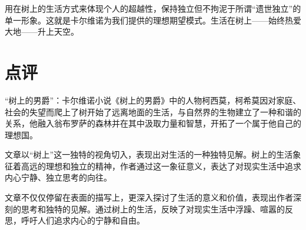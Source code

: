 \documentclass[12pt,a4paper]{article}
\begin{document}
用在树上的生活方式来体现个人的超越性，保持独立但不拘泥于所谓“遗世独立”的单一形象。这就是卡尔维诺为我们提供的理想期望模式。生活在树上——始终热爱大地——升上天空。


\section*{点评}
“树上的男爵”：卡尔维诺小说《树上的男爵》中的人物柯西莫，柯希莫因对家庭、社会的失望而爬上了树开始了远离地面的生活，与自然界的生物建立了一种和谐的关系，他融入翁布罗萨的森林并在其中汲取力量和智慧，开拓了一个属于他自己的理想国。

文章以“树上”这一独特的视角切入，表现出对生活的一种独特见解。树上的生活象征着高远的理想和独立的精神，作者通过这一象征意义，表达了对现实生活中追求内心宁静、独立思考的向往。

文章不仅仅停留在表面的描写上，更深入探讨了生活的意义和价值，表现出作者深刻的思考和独特的见解。通过树上的生活，反映了对现实生活中浮躁、喧嚣的反思，呼吁人们追求内心的宁静和自由。
\end{document}
